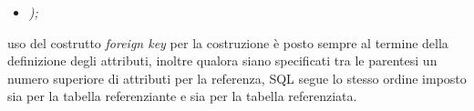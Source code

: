 \documentclass{article}
\begin{document}
\begin{itemize}[label={ }, leftmargin=1cm]
    \item \textit{);}
\end{itemize}
uso del costrutto \textit{foreign key} per la costruzione è posto sempre al termine della definizione degli attributi, inoltre qualora siano specificati tra le parentesi un numero superiore di attributi per la referenza, SQL segue lo stesso ordine imposto sia per la tabella referenziante e sia per la tabella referenziata. 
\end{document}
